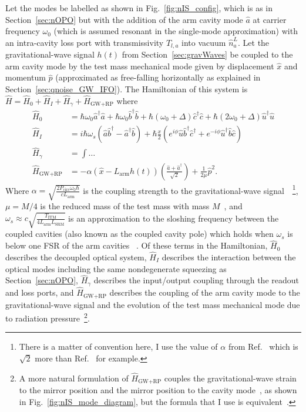 Let the modes be labelled as shown in Fig.~\ref{fig:nIS_config}, which is as in Section~\ref{sec:nOPO} but with the addition of the arm cavity mode $\hat a$ at carrier frequency $\omega_0$ (which is assumed resonant in the single-mode approximation) with an intra-cavity loss port with transmissivity $T_{l,a}$ into vacuum $\hat n^L_a$. Let the gravitational-wave signal $h(t)$ from Section~\ref{sec:gravWaves} be coupled to the arm cavity mode by the test mass mechanical mode given by displacement $\hat x$ and momentum $\hat p$ (approximated as free-falling horizontally as explained in Section~\ref{sec:qnoise_GW_IFO}).
The Hamiltonian of this system is $\hat H = \hat H_0 + \hat H_I + \hat H_\gamma + \hat H_\text{GW+RP}$ where~\cite{} 
\begin{align}
\hat H_0 &= \hbar \omega_0 \hat a^\dag \hat a + \hbar \omega_0 \hat b^\dag \hat b+ \hbar (\omega_0+\Delta) \hat c^\dag \hat c + \hbar (2\omega_0+\Delta) \hat u^\dag \hat u\\
\hat H_I &= i\hbar\omega_s(\hat a\hat b^\dag-\hat a^\dag\hat b) + \hbar \frac{x}{2} (e^{i\phi} \hat u \hat b^\dag \hat c^\dag+e^{-i\phi} \hat u^\dag \hat b \hat c) \\
\hat H_\gamma &= \int \ldots \\
\hat H_\text{GW+RP} &= -\alpha (\hat{x}-L_\mathrm{arm}h(t))\left(\frac{\hat{a}+\hat{a}^\dag}{\sqrt{2}}\right)+\frac{1}{2\mu}\hat{p}^2.
\end{align}
Where $\alpha=\sqrt{\frac{2 P_\text{circ} \omega_0 \hbar}{c  L_\text{arm}}}$ is the coupling strength to the gravitational-wave signal~\cite{liBroadbandSensitivityImprovement2020}~\footnote{There is a matter of convention here, I use the value of $\alpha$ from Ref.~\cite{liBroadbandSensitivityImprovement2020} which is $\sqrt2$ more than Ref.~\cite{korobkoQuantumExpanderGravitationalwave2019} for example. }, $\mu=M/4$ is the reduced mass  of the test mass with mass $M$~\cite{}, and $\omega_s\approx c\sqrt{\frac{T_\text{ITM}}{4 L_\text{arm} L_\text{SRM}}}$ is an approximation to the sloshing frequency between the coupled cavities (also known as the coupled cavity pole) which holds when $\omega_s$ is below one FSR of the arm cavities ~\cite{}.
Of these terms in the Hamiltonian, $\hat H_0$ describes the decoupled optical system, $\hat H_I$ describes the interaction between the optical modes including the same nondegenerate squeezing as Section~\ref{sec:nOPO}, $\hat H_\gamma$ describes the input/output coupling through the readout and loss ports, and $\hat H_\text{GW+RP}$ describes the coupling of the arm cavity mode to the gravitational-wave signal and the evolution of the test mass mechanical mode due to radiation pressure~\footnote{A more natural formulation of $\hat H_\text{GW+RP}$ couples the gravitational-wave strain to the mirror position and the mirror position to the cavity mode~\cite{}, as shown in Fig.~\ref{fig:nIS_mode_diagram}, but the formula that I use is equivalent~\cite{}.}.
